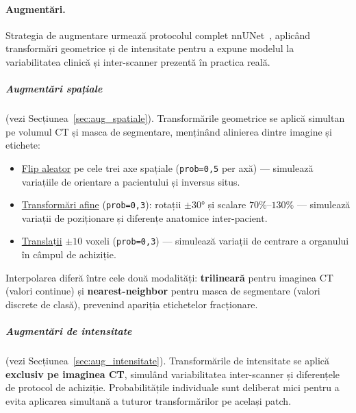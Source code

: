 \documentclass[12pt, a4paper]{report}
\begin{document}
\paragraph{Augmentări.}
Strategia de augmentare urmează protocolul complet nnUNet~\cite{isensee2019automated},
aplicând transformări geometrice și de intensitate pentru a expune modelul
la variabilitatea clinică și inter-scanner prezentă în practica reală.

\subparagraph{Augmentări spațiale}
(vezi Secțiunea~\ref{sec:aug_spatiale}).
Transformările geometrice se aplică simultan pe volumul CT și masca
de segmentare, menținând alinierea dintre imagine și etichete:

\begin{itemize}
    \item \hyperref[sec:randflip]{Flip aleator} pe cele trei axe
          spațiale (\texttt{prob=0,5} per axă) — simulează variațiile
          de orientare a pacientului și inversus situs.

    \item \hyperref[sec:randaffine]{Transformări afine}
          (\texttt{prob=0,3}): rotații $\pm 30°$ și scalare
          $70\%$--$130\%$ — simulează variații de poziționare și
          diferențe anatomice inter-pacient.

    \item \hyperref[sec:randaffine]{Translații} $\pm 10$ voxeli
          (\texttt{prob=0,3}) — simulează variații de centrare
          a organului în câmpul de achiziție.
\end{itemize}

Interpolarea diferă între cele două modalități: \textbf{trilineară}
pentru imaginea CT (valori continue) și \textbf{nearest-neighbor}
pentru masca de segmentare (valori discrete de clasă), prevenind
apariția etichetelor fracționare.

\subparagraph{Augmentări de intensitate}
(vezi Secțiunea~\ref{sec:aug_intensitate}).
Transformările de intensitate se aplică \textbf{exclusiv pe imaginea CT},
simulând variabilitatea inter-scanner și diferențele de protocol
de achiziție. Probabilitățile individuale sunt deliberat mici pentru
a evita aplicarea simultană a tuturor transformărilor pe același patch.
\end{document}
